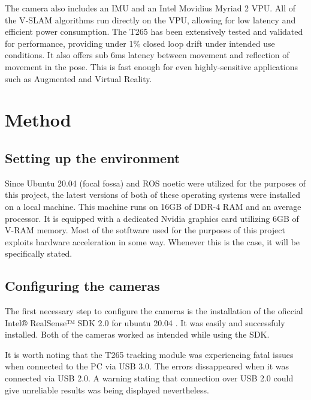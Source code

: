 \documentclass{article}
\begin{document}
The camera also includes an IMU and an Intel Movidius Myriad 2 VPU. All of the V‑SLAM algorithms run directly on the VPU, allowing for low latency and efficient power consumption. The T265 has been extensively tested and validated for performance, providing under 1\% closed loop drift under intended use conditions. It also offers sub 6ms latency between movement and reflection of movement in the pose. This is fast enough for even highly-sensitive applications such as Augmented and Virtual Reality. 

\section{Method}

\subsection{Setting up the environment}

Since Ubuntu 20.04 (focal fossa) and ROS noetic were utilized for the purposes of this project, the latest versions of both of these operating systems were installed on a local machine. This machine runs on 16GB of DDR-4 RAM and an average processor. It is equipped with a dedicated Nvidia graphics card utilizing 6GB of V-RAM memory. Most of the sotftware used for the purposes of this project exploits hardware acceleration in some way. Whenever this is the case, it will be specifically stated.

\subsection{Configuring the cameras}

The first necessary step to configure the cameras is the installation of the oficcial Intel® RealSense™ SDK 2.0 for ubuntu 20.04 . It was easily and successfuly installed. Both of the cameras worked as intended while using the SDK.

It is worth noting that the T265 tracking module was experiencing fatal issues when connected to the PC via USB 3.0. The errors dissappeared when it was connected via USB 2.0. A warning stating that connection over USB 2.0 could give unreliable results was being displayed nevertheless.
\end{document}
